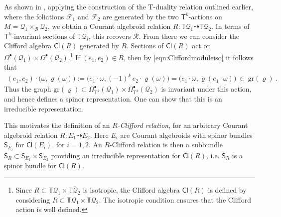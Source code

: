 \documentclass[a4paper, reqno, 11pt]{amsart}
\numberwithin{equation}{section}
\theoremstyle{definition}
\newcommand{\IT}{\mathbb{T}}
\newcommand{\Cl}{\mathsf{Cl}}
\newcommand{\cB}{{\mathcal B}}
\newcommand{\cQ}{{\mathcal Q}}
\newcommand{\cF}{{\mathcal F}}
\newcommand{\sfS}{{\mathsf{S}}}
\newcommand{\sfT}{{\mathsf{T}}}
\newcommand{\sfOmega}{{\mathsf{\Omega}}}
\newcommand{\sfCl}{\mathsf{Cl}}
\newcommand{\gr}{\text{gr}}
\newcommand{\rel}{\dashrightarrow}
\theoremstyle{remark}
\begin{document}
As shown in \cite{DeFraja:2023fhe}, applying the construction of the T-duality relation outlined earlier, where the foliations $\cF_1$ and  $\cF_2$ are generated by the two $\sfT^k$-actions on $M = \cQ_1 \times_\cB \cQ_2$, we obtain a Courant algebroid relation $R \colon \IT \cQ_1 \rel \IT \cQ_2$. In terms of $\sfT^k$-invariant sections of $\IT \cQ_i$, this recovers $\mathscr{R}$. From there we can consider the Clifford algebra  $\Cl(R)$ generated by $R$. Sections of $\Cl(R)$ act on $\sfOmega^\bullet(\cQ_1) \times \sfOmega^\bullet(\cQ_2)$.\footnote{Since $R \subset \IT \cQ_1 \times \overline{\IT \cQ_2}$ is isotropic, the Clifford algebra $\sfCl(R)$ is defined by considering $R\subset \IT \cQ_1 \times \IT \cQ_2$. The isotropic condition ensures that the Clifford action is well defined.} If $(e_1, e_2) \in R$, then by \eqref{eqn:Cliffordmoduleiso} it follows that
\begin{align}
    (e_1, e_2) \cdot \big(\omega, \varrho(\omega)\big) :=  \big(e_1 \cdot \omega, (-1)^k\,e_2 \cdot \varrho(\omega)\big) = \big(e_1 \cdot \omega, \varrho( e_1 \cdot \omega)\big) \ \in \ \gr(\varrho) \ .
\end{align}
Thus the graph $\gr(\varrho)\subset\sfOmega_{\sfT^k}^\bullet(\cQ_1) \times \sfOmega_{\sfT^k}^\bullet(\cQ_2)$ is invariant under this action, and hence defines a spinor representation. One can show that this is an irreducible representation. 

This motivates the definition of an \emph{$R$-Clifford relation}, for an arbitrary Courant algebroid relation $R \colon E_1 \rel E_2$. Here $E_i$ are Courant algebroids with spinor bundles $\sfS_{E_i}$ for $\Cl(E_i)$, for  $i=1,2$. An $R$-Clifford relation is then a subbundle $\sfS_R \subset \sfS_{E_1} \times \sfS_{E_2}$ providing an irreducible representation for $\Cl(R)$, i.e. $\sfS_R$ is a spinor bundle for $\Cl(R)$.

\medskip
\end{document}
